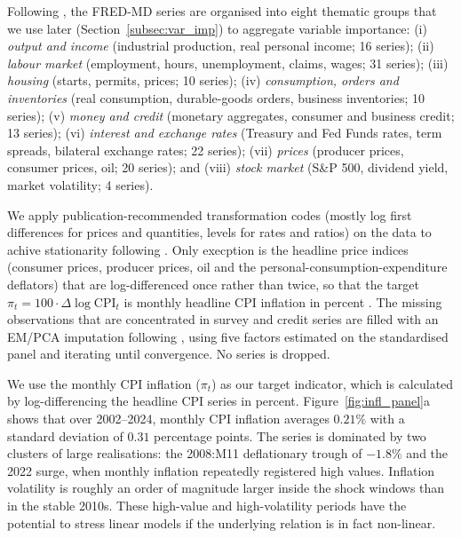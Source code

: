 \documentclass[12pt,a4paper]{article}
\begin{document}
Following \citet{mccracken2016fredmd}, the FRED-MD series are organised into eight thematic groups that we use later (Section~\ref{subsec:var_imp}) to aggregate variable importance: (i) \emph{output and income} (industrial production, real personal income; 16 series); (ii) \emph{labour market} (employment, hours, unemployment, claims, wages; 31 series); (iii) \emph{housing} (starts, permits, prices; 10 series); (iv) \emph{consumption, orders and inventories} (real consumption, durable-goods orders, business inventories; 10 series); (v) \emph{money and credit} (monetary aggregates, consumer and business credit; 13 series); (vi) \emph{interest and exchange rates} (Treasury and Fed Funds rates, term spreads, bilateral exchange rates; 22 series); (vii) \emph{prices} (producer prices, consumer prices, oil; 20 series); and (viii) \emph{stock market} (S\&P 500, dividend yield, market volatility; 4 series).

We apply publication-recommended transformation codes (mostly log first differences for prices and quantities, levels for rates and ratios) on the data to achive stationarity following \cite{mccracken2016fredmd}. Only execption is the headline price indices (consumer prices, producer prices, oil and the personal-consumption-expenditure deflators) that are log-differenced once rather than twice, so that the target $\pi_t = 100 \cdot \Delta \log \mathrm{CPI}_t$ is monthly headline CPI inflation in percent \citep{medeiros2021veiga}. The missing observations that are concentrated in survey and credit series are filled with an EM/PCA imputation following \citet{stockwatson2002}, using five factors estimated on the standardised panel and iterating until convergence. No series is dropped. 

We use the monthly CPI inflation ($\pi_t$) as our target indicator, which is calculated by log-differencing the headline CPI series in percent. Figure~\ref{fig:infl_panel}a shows that over 2002--2024, monthly CPI inflation averages $0.21\%$ with a standard deviation of $0.31$ percentage points. The series is dominated by two clusters of large realisations: the 2008:M11 deflationary trough of $-1.8\%$ and the 2022 surge, when monthly inflation repeatedly registered high values. Inflation volatility is roughly an order of magnitude larger inside the shock windows than in the stable 2010s. These high-value and high-volatility periods have the potential to stress linear models if the underlying relation is in fact non-linear.
\end{document}
